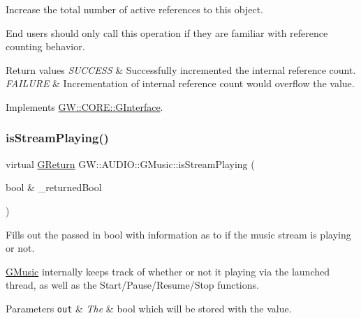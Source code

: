 Increase the total number of active references to this object. 

End users should only call this operation if they are familiar with reference counting behavior.


\begin{DoxyRetVals}{Return values}
{\em S\+U\+C\+C\+E\+SS} & Successfully incremented the internal reference count. \\
\hline
{\em F\+A\+I\+L\+U\+RE} & Incrementation of internal reference count would overflow the value. \\
\hline
\end{DoxyRetVals}


Implements \hyperlink{classGW_1_1CORE_1_1GInterface_a2d710f20bb78e544e8309b5b75c21260}{G\+W\+::\+C\+O\+R\+E\+::\+G\+Interface}.

\mbox{\label{classGW_1_1AUDIO_1_1GMusic_a0a0f4d5e0d11f7aec7ed9a1a6371df1a}} 
\subsubsection{\texorpdfstring{is\+Stream\+Playing()}{isStreamPlaying()}}
{\footnotesize\ttfamily virtual \hyperlink{namespaceGW_a67a839e3df7ea8a5c5686613a7a3de21}{G\+Return} G\+W\+::\+A\+U\+D\+I\+O\+::\+G\+Music\+::is\+Stream\+Playing (\begin{DoxyParamCaption}\item[{bool \&}]{\+\_\+returned\+Bool }\end{DoxyParamCaption})\hspace{0.3cm}{\ttfamily [pure virtual]}}



Fills out the passed in bool with information as to if the music stream is playing or not. 

\hyperlink{classGW_1_1AUDIO_1_1GMusic}{G\+Music} internally keeps track of whether or not it playing via the launched thread, as well as the Start/\+Pause/\+Resume/\+Stop functions.


\begin{DoxyParams}[1]{Parameters}
\mbox{\tt out}  & {\em The} & bool which will be stored with the value.\\
\hline
\end{DoxyParams}

